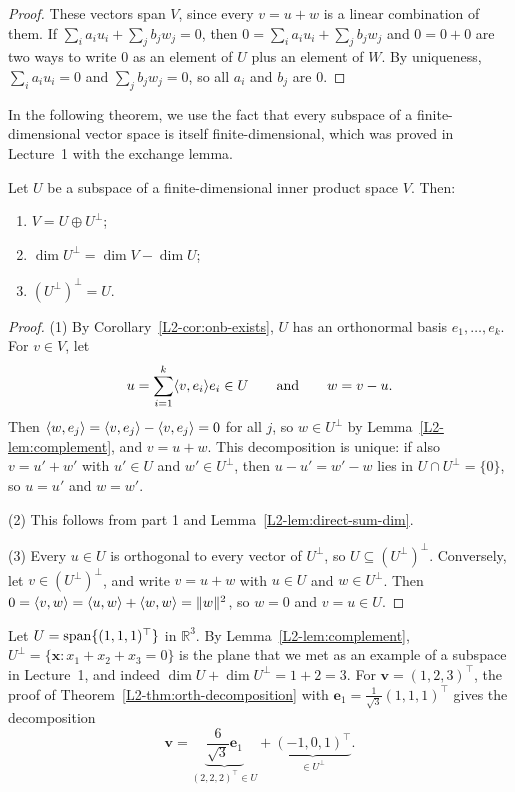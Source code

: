 \begin{proof}
    These vectors span $V$, since every $v = u + w$ is a linear combination of them. If $\sum_i a_i u_i + \sum_j b_j w_j = 0$, then $0 = \sum_i a_i u_i + \sum_j b_j w_j$ and $0 = 0 + 0$ are two ways to write $0$ as an element of $U$ plus an element of $W$. By uniqueness, $\sum_i a_i u_i = 0$ and $\sum_j b_j w_j = 0$, so all $a_i$ and $b_j$ are $0$.
\end{proof}

In the following theorem, we use the fact that every subspace of a finite-dimensional vector space is itself finite-dimensional, which was proved in Lecture~1 with the exchange lemma.

\begin{theorem}\label{L2-thm:orth-decomposition}
    Let $U$ be a subspace of a finite-dimensional inner product space $V$. Then:
    \begin{enumerate}
        \item $V = U \oplus U^\perp$;
        \item $\dim U^\perp = \dim V - \dim U$;
        \item $(U^\perp)^\perp = U$.
    \end{enumerate}
\end{theorem}

\begin{proof}
    (1) By Corollary~\ref{L2-cor:onb-exists}, $U$ has an orthonormal basis $e_1, \ldots, e_k$. For $v \in V$, let
    \[u = \sum_{i=1}^k \langle v, e_i \rangle e_i \in U \qquad \text{and} \qquad w = v - u.\]
    Then $\langle w, e_j \rangle = \langle v, e_j \rangle - \langle v, e_j \rangle = 0$ for all $j$, so $w \in U^\perp$ by Lemma~\ref{L2-lem:complement}, and $v = u + w$. This decomposition is unique: if also $v = u' + w'$ with $u' \in U$ and $w' \in U^\perp$, then $u - u' = w' - w$ lies in $U \cap U^\perp = \{0\}$, so $u = u'$ and $w = w'$.

    (2) This follows from part 1 and Lemma~\ref{L2-lem:direct-sum-dim}.

    (3) Every $u \in U$ is orthogonal to every vector of $U^\perp$, so $U \subseteq (U^\perp)^\perp$. Conversely, let $v \in (U^\perp)^\perp$, and write $v = u + w$ with $u \in U$ and $w \in U^\perp$. Then $0 = \langle v, w \rangle = \langle u, w \rangle + \langle w, w \rangle = \lVert w \rVert^2$, so $w = 0$ and $v = u \in U$.
\end{proof}

\begin{example}\label{L2-ex:complement-line}
    Let $U = \operatorname{span}\{(1, 1, 1)^\top\}$ in $\mathbb{R}^3$. By Lemma~\ref{L2-lem:complement}, $U^\perp = \{\mathbf{x} : x_1 + x_2 + x_3 = 0\}$ is the plane that we met as an example of a subspace in Lecture~1, and indeed $\dim U + \dim U^\perp = 1 + 2 = 3$. For $\mathbf{v} = (1, 2, 3)^\top$, the proof of Theorem~\ref{L2-thm:orth-decomposition} with $\mathbf{e}_1 = \frac{1}{\sqrt{3}}(1, 1, 1)^\top$ gives the decomposition
    \[\mathbf{v} = \underbrace{\frac{6}{\sqrt{3}} \mathbf{e}_1}_{(2, 2, 2)^\top \in U} + \underbrace{(-1, 0, 1)^\top}_{\in U^\perp}.\]
\end{example}


